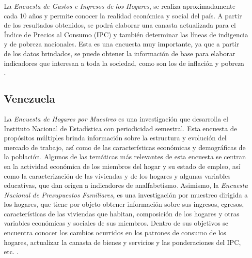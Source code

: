 La \emph{Encuesta de Gastos e Ingresos de los Hogares}, se realiza aproximadamente cada 10 años y permite conocer la realidad económica y social del país. A partir de los resultados obtenidos, se podrá elaborar una canasta actualizada para el Índice de Precios al Consumo (IPC) y también determinar las líneas de indigencia y de pobreza nacionales. Esta es una encuesta muy importante, ya que a partir de los datos brindados, se puede obtener la información de base para elaborar indicadores que interesan a toda la sociedad, como son los de inflación y pobreza \citep{INE2-UY}.

\hypertarget{venezuela}{%
\subsection*{Venezuela}\label{venezuela}}


La \emph{Encuesta de Hogares por Muestreo} es una investigación que desarrolla el Instituto Nacional de Estadística con periodicidad semestral. Esta encuesta de propósitos múltiples brinda información sobre la estructura y evolución del mercado de trabajo, así como de las características económicas y demográficas de la población. Algunos de las temáticas más relevantes de esta encuesta se centran en la actividad económica de los miembros del hogar y su estado de empleo, así como la caracterización de las viviendas y de los hogares y algunas variables educativas, que dan origen a indicadores de analfabetismo. Asimismo, la \emph{Encuesta Nacional de Presupuestos Familiares}, es una investigación por muestreo dirigida a los hogares, que tiene por objeto obtener información sobre sus ingresos, egresos, características de las viviendas que habitan, composición de los hogares y otras variables económicas y sociales de sus miembros. Dentro de sus objetivos se encuentra conocer los cambios ocurridos en los patrones de consumo de los hogares, actualizar la canasta de bienes y servicios y las ponderaciones del IPC, etc. \citep{INE-VE}.

\newpage
\blandscape


